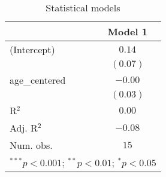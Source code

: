 
\begin{table}
\begin{center}
\begin{tabular}{l c}
\hline
 & Model 1 \\
\hline
(Intercept)   & $0.14$   \\
              & $(0.07)$ \\
age\_centered & $-0.00$  \\
              & $(0.03)$ \\
\hline
R$^2$         & $0.00$   \\
Adj. R$^2$    & $-0.08$  \\
Num. obs.     & $15$     \\
\hline
\multicolumn{2}{l}{\scriptsize{$^{***}p<0.001$; $^{**}p<0.01$; $^{*}p<0.05$}}
\end{tabular}
\caption{Statistical models}
\label{table:coefficients}
\end{center}
\end{table}

